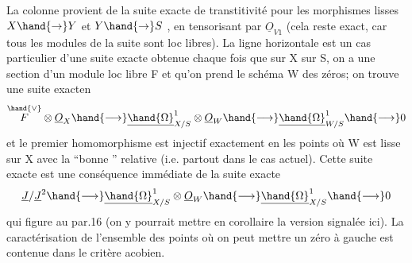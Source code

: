 
La colonne provient de la suite exacte de transtitivité pour les
morphismes lisses $X\hand{\to} Y$ et $Y\hand{\to} S$ , en  tensorisant par $\underline{O}_{V1}$ (cela reste
exact, car tous les modules de la suite sont loc libres). La ligne
horizontale est un cas particulier d'une suite exacte obtenue chaque
fois que sur X  sur S, on a une section \hand{$\mu$} d'un module loc libre F
et qu'on prend le schéma W des zéros; on trouve une suite exacten
\[ \overset{\hand{\vee}}{F}\otimes \underline{O}_X \hand{\longrightarrow} \underline{\hand{\Omega}}^1_{X/S}\otimes \underline{O}_W \hand{\longrightarrow} \underline{\hand{\Omega}}^1_{W/S} \hand{\longrightarrow} 0 \]
et  le premier homomorphisme est injectif exactement en les points où
W est lisse sur X avec la ``bonne ''  relative (i.e. partout dans
le cas actuel).  Cette suite exacte est 
  une
conséquence immédiate de la suite exacte
\[ \underline{J}/\underline{J}^2\hand{\longrightarrow} \underline{\hand{\Omega}}^1_{X/S}\otimes \underline{O}_W \hand{\longrightarrow} \underline{\hand{\Omega}}^1_{X/S} \hand{\longrightarrow} 0 \]
\margin{16 \textbar} qui figure au par.16 (on y pourrait mettre en corollaire la version
signalée ici). La caractérisation de l'ensemble des points où on
peut mettre un zéro à gauche est contenue dans le critère acobien.

